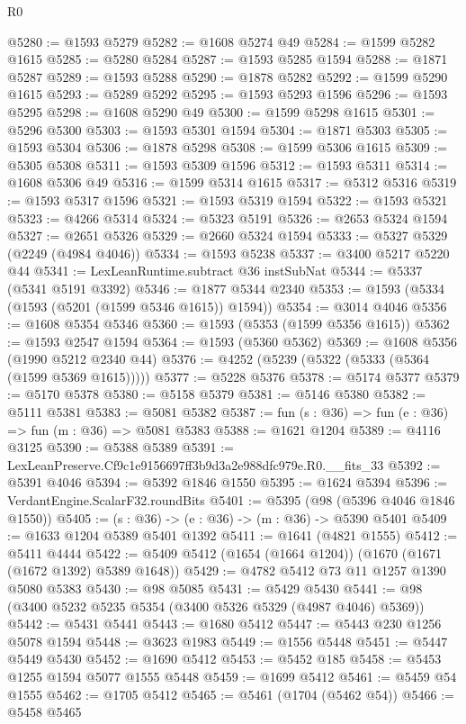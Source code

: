 \begin{lexlean}{R0}
\begin{coremodule}
@5280 := @1593 @5279
@5282 := @1608 @5274 @49
@5284 := @1599 @5282 @1615
@5285 := @5280 @5284
@5287 := @1593 @5285 @1594
@5288 := @1871 @5287
@5289 := @1593 @5288
@5290 := @1878 @5282
@5292 := @1599 @5290 @1615
@5293 := @5289 @5292
@5295 := @1593 @5293 @1596
@5296 := @1593 @5295
@5298 := @1608 @5290 @49
@5300 := @1599 @5298 @1615
@5301 := @5296 @5300
@5303 := @1593 @5301 @1594
@5304 := @1871 @5303
@5305 := @1593 @5304
@5306 := @1878 @5298
@5308 := @1599 @5306 @1615
@5309 := @5305 @5308
@5311 := @1593 @5309 @1596
@5312 := @1593 @5311
@5314 := @1608 @5306 @49
@5316 := @1599 @5314 @1615
@5317 := @5312 @5316
@5319 := @1593 @5317 @1596
@5321 := @1593 @5319 @1594
@5322 := @1593 @5321
@5323 := @4266 @5314
@5324 := @5323 @5191
@5326 := @2653 @5324 @1594
@5327 := @2651 @5326
@5329 := @2660 @5324 @1594
@5333 := @5327 @5329 (@2249 (@4984 @4046))
@5334 := @1593 @5238
@5337 := @3400 @5217 @5220 @44
@5341 := LexLeanRuntime.subtract @36 instSubNat
@5344 := @5337 (@5341 @5191 @3392)
@5346 := @1877 @5344 @2340
@5353 := @1593 (@5334 (@1593 (@5201 (@1599 @5346 @1615)) @1594))
@5354 := @3014 @4046
@5356 := @1608 @5354 @5346
@5360 := @1593 (@5353 (@1599 @5356 @1615))
@5362 := @1593 @2547 @1594
@5364 := @1593 (@5360 @5362)
@5369 := @1608 @5356 (@1990 @5212 @2340 @44)
@5376 := @4252 (@5239 (@5322 (@5333 (@5364 (@1599 @5369 @1615)))))
@5377 := @5228 @5376
@5378 := @5174 @5377
@5379 := @5170 @5378
@5380 := @5158 @5379
@5381 := @5146 @5380
@5382 := @5111 @5381
@5383 := @5081 @5382
@5387 := fun (s : @36) => fun (e : @36) => fun (m : @36) => @5081 @5383
@5388 := @1621 @1204
@5389 := @4116 @3125
@5390 := @5388 @5389
@5391 := LexLeanPreserve.Cf9c1e9156697ff3b9d3a2e988dfc979e.R0.__fits_33
@5392 := @5391 @4046
@5394 := @5392 @1846 @1550
@5395 := @1624 @5394
@5396 := VerdantEngine.ScalarF32.roundBits
@5401 := @5395 (@98 (@5396 @4046 @1846 @1550))
@5405 := (s : @36) -> (e : @36) -> (m : @36) -> @5390 @5401
@5409 := @1633 @1204 @5389 @5401 @1392
@5411 := @1641 (@4821 @1555)
@5412 := @5411 @4444
@5422 := @5409 @5412 (@1654 (@1664 @1204)) (@1670 (@1671 (@1672 @1392) @5389 @1648))
@5429 := @4782 @5412 @73 @11 @1257 @1390 @5080 @5383
@5430 := @98 @5085
@5431 := @5429 @5430
@5441 := @98 (@3400 @5232 @5235 @5354 (@3400 @5326 @5329 (@4987 @4046) @5369))
@5442 := @5431 @5441
@5443 := @1680 @5412
@5447 := @5443 @230 @1256 @5078 @1594
@5448 := @3623 @1983
@5449 := @1556 @5448
@5451 := @5447 @5449 @5430
@5452 := @1690 @5412
@5453 := @5452 @185
@5458 := @5453 @1255 @1594 @5077 @1555 @5448
@5459 := @1699 @5412
@5461 := @5459 @54 @1555
@5462 := @1705 @5412
@5465 := @5461 (@1704 (@5462 @54))
@5466 := @5458 @5465

\end{coremodule}
\end{lexlean}

